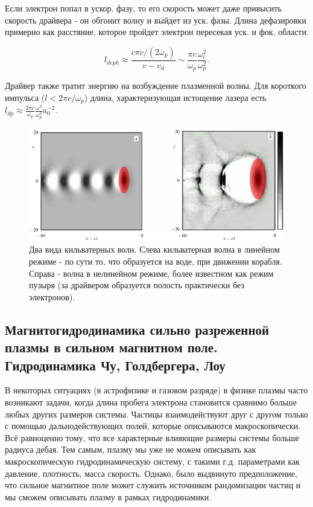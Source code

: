 \documentclass[10pt, a4paper]{article}
\begin{document}
Если электрон попал в ускор. фазу, то его скорость может даже привысить скорость драйвера - он обгонит волну и выйдет из
уск. фазы. Длина дефазировки примерно как расстяние, которое пройдет электрон пересекая уск. и фок. области.

\begin{equation}
    l_{deph}\approx \frac{c\pi c/(2\omega_p)}{v - v_d} \sim \frac{\pi c}{\omega_p}\frac{\omega_l^2}{\omega_p^2}.
\end{equation}

Драйвер также тратит энергию на возбуждение плазменной волны. Для короткого импульса ($l < 2\pi c/\omega_p$) длина, 
характеризующая истощение лазера есть $l_{dp}\approx \frac{2\pi c}{\omega_p} \frac{\omega^2}{\omega_p^2}a_0^{-2}$.



\begin{figure}[ht]
	\begin{center}
		\includegraphics[width=0.6\linewidth]{wake-f.png}
	\end{center}
	\caption{Два вида кильватерных волн. Слева кильватерная волна в линейном режиме - по сути то, что образуется на 
    воде, при движении корабля. Справа - волна в нелинейном режиме, более известном как режим пузыря (за драйвером
    образуется полость практически без электронов).}
	\label{fig:scattering}
\end{figure}



\subsection{Магнитогидродинамика сильно разреженной плазмы в сильном магнитном поле. Гидродинамика Чу, Голдбергера, Лоу}

	В некоторых ситуациях (в астрофизике и газовом разряде) в физике плазмы часто возникают задачи, когда длина пробега электрона становится сравнимо больше любых других размеров системы. Частицы взаимодействуют друг с другом только с помощью дальнодействующих полей, которые описываются макроскопически. Всё равноценно тому, что все характерные влияющие размеры системы больше радиуса дебая. Тем самым, плазму мы уже не можем описывать как макроскопическую гидродинамическую систему, с такими г.д. параметрами как давление, плотность, масса скорость. Однако, было выдвинуто предположение, что сильное магнитное поле может служить источником рандомизации частиц и мы сможем описывать плазму в рамках гидродинамики.
\end{document}
